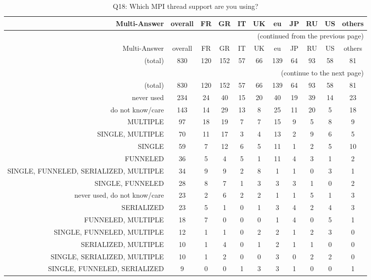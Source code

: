 \clearpage%
{\footnotesize\begin{landscape}%
\begin{longtable}[htb]{r|c|c|c|c|c|c|c|c|c|c}%
\caption{Q18: Which MPI thread support are you using?}%
\label{tab:Q18-mans} \\%
\hline%
Multi-Answer & overall & FR & GR & IT & UK & eu & JP & RU & US & others \\
 \hline%
\endfirsthead%
\multicolumn{11}{r}{(continued from the previous page)}\\%
\hline%
Multi-Answer & overall & FR & GR & IT & UK & eu & JP & RU & US & others \\
 \hline%
\endhead%
\hline%
(total) & 830 & 120 & 152 & 57 & 66 & 139 & 64 & 93 & 58 & 81 \\%
\hline%
\multicolumn{11}{r}{(continue to the next page)}\\%
\endfoot%
\hline%
(total) & 830 & 120 & 152 & 57 & 66 & 139 & 64 & 93 & 58 & 81 \\%
\hline%
\endlastfoot%
\hline%
{never used} & 234 & 24 & 40 & 15 & 20 & 40 & 19 & 39 & 14 & 23 \\%
{do not know/care} & 143 & 14 & 29 & 13 & 8 & 25 & 11 & 20 & 5 & 18 \\%
{MULTIPLE} & 97 & 18 & 19 & 7 & 7 & 15 & 9 & 5 & 8 & 9 \\%
{SINGLE, MULTIPLE} & 70 & 11 & 17 & 3 & 4 & 13 & 2 & 9 & 6 & 5 \\%
{SINGLE} & 59 & 7 & 12 & 6 & 5 & 11 & 1 & 2 & 5 & 10 \\%
{FUNNELED} & 36 & 5 & 4 & 5 & 1 & 11 & 4 & 3 & 1 & 2 \\%
{SINGLE, FUNNELED, SERIALIZED, MULTIPLE} & 34 & 9 & 9 & 2 & 8 & 1 & 1 & 0 & 3 & 1 \\%
{SINGLE, FUNNELED} & 28 & 8 & 7 & 1 & 3 & 3 & 3 & 1 & 0 & 2 \\%
{never used, do not know/care} & 23 & 2 & 6 & 2 & 2 & 1 & 1 & 5 & 1 & 3 \\%
{SERIALIZED} & 23 & 5 & 1 & 0 & 1 & 3 & 4 & 2 & 4 & 3 \\%
{FUNNELED, MULTIPLE} & 18 & 7 & 0 & 0 & 0 & 1 & 4 & 0 & 5 & 1 \\%
{SINGLE, FUNNELED, MULTIPLE} & 12 & 1 & 1 & 0 & 2 & 2 & 1 & 2 & 3 & 0 \\%
{SERIALIZED, MULTIPLE} & 10 & 1 & 4 & 0 & 1 & 2 & 1 & 1 & 0 & 0 \\%
{SINGLE, SERIALIZED, MULTIPLE} & 10 & 1 & 2 & 0 & 0 & 3 & 0 & 2 & 2 & 0 \\%
{SINGLE, FUNNELED, SERIALIZED} & 9 & 0 & 0 & 1 & 3 & 3 & 1 & 0 & 0 & 1 \\%

\end{longtable}
\end{landscape}}
